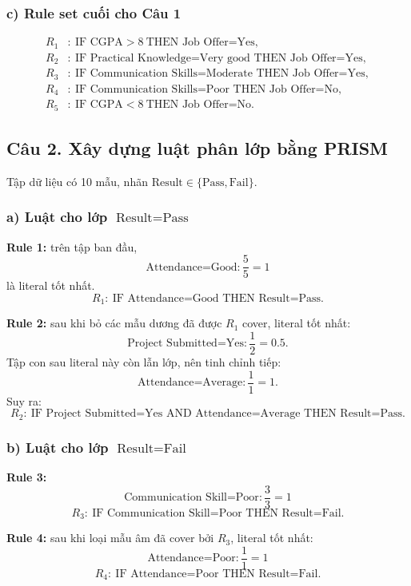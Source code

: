 \subsubsection*{c) Rule set cuối cho Câu 1}
\[
\begin{aligned}
R_1&:\ \text{IF CGPA}>8\ \text{THEN Job Offer=Yes},\\
R_2&:\ \text{IF Practical Knowledge=Very good THEN Job Offer=Yes},\\
R_3&:\ \text{IF Communication Skills=Moderate THEN Job Offer=Yes},\\
R_4&:\ \text{IF Communication Skills=Poor THEN Job Offer=No},\\
R_5&:\ \text{IF CGPA}<8\ \text{THEN Job Offer=No}.
\end{aligned}
\]

\subsection*{Câu 2. Xây dựng luật phân lớp bằng PRISM}

Tập dữ liệu có 10 mẫu, nhãn \(\text{Result} \in \{\text{Pass},\text{Fail}\}\).

\subsubsection*{a) Luật cho lớp \(\text{Result}=\text{Pass}\)}

\textbf{Rule 1:}
trên tập ban đầu,
\[
\text{Attendance=Good}:\frac{5}{5}=1
\]
là literal tốt nhất.
\[
R_1:\ \text{IF Attendance=Good THEN Result=Pass}.
\]

\textbf{Rule 2:}
sau khi bỏ các mẫu dương đã được \(R_1\) cover, literal tốt nhất:
\[
\text{Project Submitted=Yes}:\frac{1}{2}=0.5.
\]
Tập con sau literal này còn lẫn lớp, nên tinh chỉnh tiếp:
\[
\text{Attendance=Average}:\frac{1}{1}=1.
\]
Suy ra:
\[
R_2:\ \text{IF Project Submitted=Yes AND Attendance=Average THEN Result=Pass}.
\]

\subsubsection*{b) Luật cho lớp \(\text{Result}=\text{Fail}\)}

\textbf{Rule 3:}
\[
\text{Communication Skill=Poor}:\frac{3}{3}=1
\]
\[
R_3:\ \text{IF Communication Skill=Poor THEN Result=Fail}.
\]

\textbf{Rule 4:}
sau khi loại mẫu âm đã cover bởi \(R_3\), literal tốt nhất:
\[
\text{Attendance=Poor}:\frac{1}{1}=1
\]
\[
R_4:\ \text{IF Attendance=Poor THEN Result=Fail}.
\]

